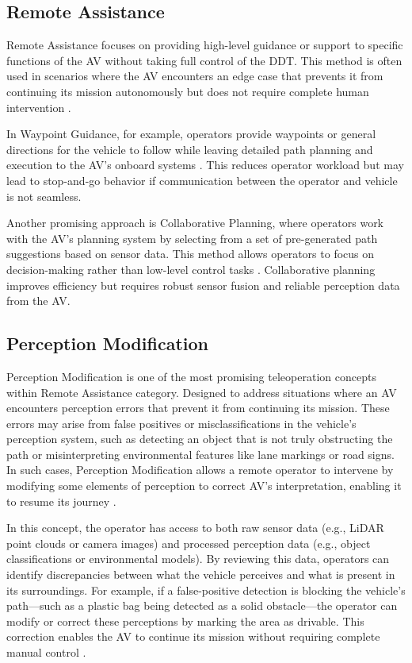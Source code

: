 \subsection{Remote Assistance}
Remote Assistance focuses on providing high-level guidance or support
to specific functions of the AV without taking full control of the DDT.
This method is often used in scenarios where the AV encounters an
edge case that prevents it from continuing its mission autonomously
but does not require complete human intervention \cite{Brecht}.

In Waypoint Guidance, for example, operators provide waypoints or general
directions for the vehicle to follow while leaving detailed path planning
and execution to the AV's onboard systems \cite{corridor}. This reduces
operator workload but may lead to stop-and-go behavior if communication
between the operator and vehicle is not seamless.

Another promising approach is Collaborative Planning, where operators
work with the AV's planning system by selecting from a set of pre-generated
path suggestions based on sensor data. This method allows operators to focus
on decision-making rather than low-level control tasks \cite{hosseini2024collaborative}.
Collaborative planning improves efficiency but requires robust sensor fusion and reliable
perception data from the AV.
\subsection{Perception Modification}

Perception Modification is one of the most promising teleoperation
concepts within Remote Assistance category. Designed to address situations where an \ac{AV}
encounters perception errors that prevent it
from continuing its mission. These errors may arise from false
positives or misclassifications in the vehicle's perception system,
such as detecting an object that is not truly obstructing the path or
misinterpreting environmental features like lane markings or road signs.
In such cases, Perception Modification allows a remote operator to
intervene by modifying some elements of perception to correct \ac{AV}'s interpretation,
enabling it to resume its journey \cite{Feiler2021ThePM}.

In this concept, the operator has access to both raw sensor data
(e.g., \ac{LiDAR} point clouds or camera images) and processed perception
data (e.g., object classifications or environmental models).
By reviewing this data, operators can identify discrepancies
between what the vehicle perceives and what is present in its
surroundings. For example, if a false-positive detection is blocking
the vehicle's path—such as a plastic bag being detected as a solid
obstacle—the operator can modify or correct these perceptions by
marking the area as drivable. This correction enables the AV to
continue its mission without requiring complete manual control \cite{Feiler2021ThePM}.

